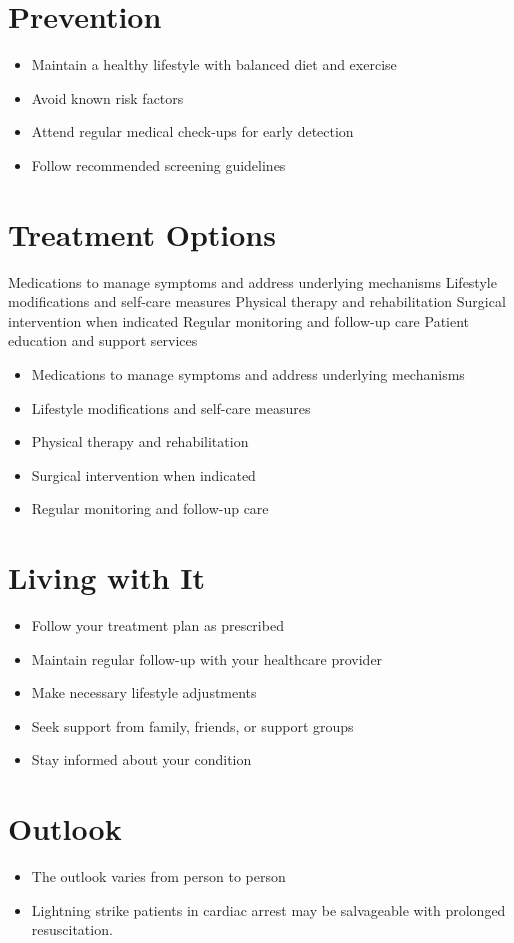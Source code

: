 \section{Prevention}
\begin{itemize}[noitemsep]
  \item Maintain a healthy lifestyle with balanced diet and exercise
  \item Avoid known risk factors
  \item Attend regular medical check-ups for early detection
  \item Follow recommended screening guidelines
\end{itemize}
\section{Treatment Options}
Medications to manage symptoms and address underlying mechanisms Lifestyle modifications and self-care measures Physical therapy and rehabilitation Surgical intervention when indicated Regular monitoring and follow-up care Patient education and support services

\begin{itemize}[noitemsep]
  \item Medications to manage symptoms and address underlying mechanisms
  \item Lifestyle modifications and self-care measures
  \item Physical therapy and rehabilitation
  \item Surgical intervention when indicated
  \item Regular monitoring and follow-up care
\end{itemize}
\section{Living with It}
\begin{itemize}[noitemsep]
  \item Follow your treatment plan as prescribed
  \item Maintain regular follow-up with your healthcare provider
  \item Make necessary lifestyle adjustments
  \item Seek support from family, friends, or support groups
  \item Stay informed about your condition
\end{itemize}
\section{Outlook}
\begin{itemize}[noitemsep]
  \item The outlook varies from person to person
  \item Lightning strike patients in cardiac arrest may be salvageable with prolonged resuscitation.
\end{itemize}
